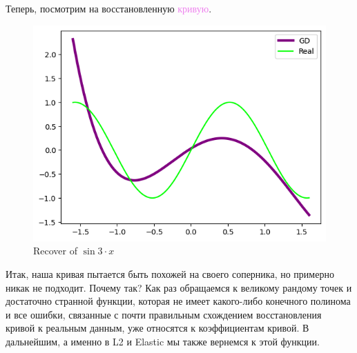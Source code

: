 \documentclass[12pt, a4paper, oneside, final]{article}
\begin{document}
	Теперь, посмотрим на восстановленную \textcolor{violet}{кривую}.
	\begin{figure}[H]
		\centering
		\includegraphics[scale = 1]{Image/AT2_L1_RECOVER.png}
		\caption*{Recover of $\sin{3 \cdot x}$}
	\end{figure}
	Итак, наша кривая пытается быть похожей на своего соперника, но примерно никак не подходит.
	Почему так?
	Как раз обращаемся к великому рандому точек и достаточно странной функции, которая не имеет какого-либо конечного полинома и все ошибки, связанные с почти правильным схождением восстановления кривой к реальным данным, уже относятся к коэффициентам кривой.
	В дальнейшим, а именно в L2 и Elastic мы также вернемся к этой функции.
\end{document}

